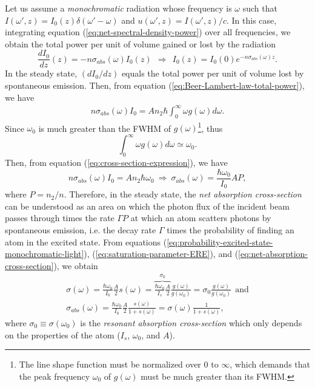 Let us assume a \textit{monochromatic} radiation whose frequency is $ \omega $ such that $  I(\omega', z) = I_0(z) \delta(\omega' - \omega) $ and $ u(\omega', z) = I(\omega', z) / c $. In this case, integrating equation (\ref{eq:net-spectral-density-power}) over all frequencies, we obtain the total power per unit of volume gained or lost by the radiation
\begin{equation}
	\frac{d I_0}{dz}(z) = -n\sigma_{abs}(\omega)I_0(z)\ \ \Rightarrow\ \ I_0(z) = I_0(0) e^{- n\sigma_{abs}(\omega)z}.
	\label{eq:Beer-Lambert-law-total-power}
\end{equation}
In the steady state, $ (dI_0/dz) $ equals the total power per unit of volume lost by spontaneous emission. Then, from equation (\ref{eq:Beer-Lambert-law-total-power}), we have
\begin{gather}
	n\sigma_{abs}(\omega) I_0 = A n_2 \hbar \int_0^{\infty} \omega g(\omega)d\omega.
	\label{eq:cross-section-expression}
\end{gather}
Since $ \omega_0 $ is much greater than the FWHM of $ g(\omega) $\footnote{The line shape function must be normalized over $ 0 $ to $ \infty $, which demands that the peak frequency $ \omega_0 $ of $ g(\omega) $ must be much greater than its FWHM.}, thus
\begin{equation}
	\int_0^{\infty} \omega g(\omega)d\omega \simeq \omega_0.
\end{equation}
Then, from equation (\ref{eq:cross-section-expression}), we have
\begin{equation}
	n \sigma_{abs}(\omega) I_0 = A n_2 \hbar \omega_0\ \Rightarrow\ \sigma_{abs}(\omega) = \frac{\hbar \omega_0}{I_0} A P,
	\label{eq:net-absorption-cross-section_2}
\end{equation}
where $ P = n_2 / n $. Therefore, in the steady state, the \textit{net absorption cross-section} can be understood as an area on which the photon flux of the incident beam passes through times the rate $ \Gamma P $ at which an atom scatters photons by spontaneous emission, i.e. the decay rate $ \Gamma $ times the probability of finding an atom in the excited state. From equations (\ref{eq:probability-excited-state-monochromatic-light}), (\ref{eq:saturation-parameter-ERE}), and (\ref{eq:net-absorption-cross-section}), we obtain
\begin{gather}
	\sigma(\omega) = \frac{\hbar \omega_0}{I_0} \frac{A}{2} s(\omega) = \overbrace{\frac{\hbar \omega_0}{I_s} \frac{A}{2}}^{\sigma_0} \frac{g(\omega)}{g(\omega_0)} = \sigma_0 \frac{g(\omega)}{g(\omega_0)}\ \ \textrm{and}
	\label{eq:absorption-cross-section-2}
	\\
	\sigma_{abs}(\omega) = \frac{\hbar \omega_0}{I_0} \frac{A}{2} \frac{s(\omega)}{1 + s(\omega)} = \sigma(\omega) \frac{1}{1 + s(\omega)},
	\label{eq:net-absorption-cross-section-2}
\end{gather}
where $ \sigma_0 \equiv \sigma(\omega_0) $ is the \textit{resonant absorption cross-section} which only depends on the properties of the atom ($ I_s$, $ \omega_0 $, and $ A $).



